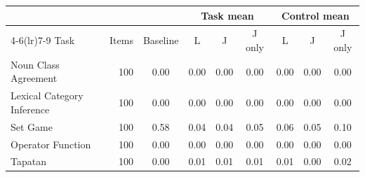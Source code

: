 \begin{tabular}{@{}lrccccccc@{}}
\toprule
 & & & \multicolumn{3}{c}{Task mean} & \multicolumn{3}{c}{Control mean} \\
\cmidrule(lr){4-6}\cmidrule(lr){7-9}
Task & Items & Baseline & L & J & J only & L & J & J only \\
\midrule
Noun Class Agreement & 100 & 0.00 & 0.00 & 0.00 & 0.00 & 0.00 & 0.00 & 0.00 \\
Lexical Category Inference & 100 & 0.00 & 0.00 & 0.00 & 0.00 & 0.00 & 0.00 & 0.00 \\
Set Game & 100 & 0.58 & 0.04 & 0.04 & 0.05 & 0.06 & 0.05 & 0.10 \\
Operator Function & 100 & 0.00 & 0.00 & 0.00 & 0.00 & 0.00 & 0.00 & 0.00 \\
Tapatan & 100 & 0.00 & 0.01 & 0.01 & 0.01 & 0.01 & 0.00 & 0.02 \\
\bottomrule
\end{tabular}
